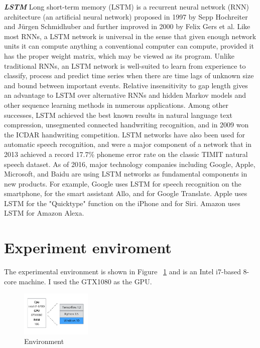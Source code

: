 \documentclass{kcc}
\begin{document}
\textbf{\textit{LSTM}}
Long short-term memory (LSTM) is a recurrent neural network (RNN) architecture (an artificial neural network) proposed in 1997 by Sepp Hochreiter and Jürgen Schmidhuber and further improved in 2000 by Felix Gers et al. Like most RNNs, a LSTM network is universal in the sense that given enough network units it can compute anything a conventional computer can compute, provided it has the proper weight matrix, which may be viewed as its program. Unlike traditional RNNs, an LSTM network is well-suited to learn from experience to classify, process and predict time series when there are time lags of unknown size and bound between important events. Relative insensitivity to gap length gives an advantage to LSTM over alternative RNNs and hidden Markov models and other sequence learning methods in numerous applications. Among other successes, LSTM achieved the best known results in natural language text compression, unsegmented connected handwriting recognition, and in 2009 won the ICDAR handwriting competition. LSTM networks have also been used for automatic speech recognition, and were a major component of a network that in 2013 achieved a record 17.7\% phoneme error rate on the classic TIMIT natural speech dataset. As of 2016, major technology companies including Google, Apple, Microsoft, and Baidu are using LSTM networks as fundamental components in new products. For example, Google uses LSTM for speech recognition on the smartphone, for the smart assistant Allo, and for Google Translate. Apple uses LSTM for the "Quicktype" function on the iPhone and for Siri. Amazon uses LSTM for Amazon Alexa.

\section{Experiment enviroment}

The experimental environment is shown in Figure ~\ref{fig:xeon} and is an Intel i7-based 8-core machine. I used the GTX1080 as the GPU.
\begin{figure}[h]
  \begin{center}
     \includegraphics[width=0.3\textwidth]{fig/env.png}
  \end{center}
  \caption{Environment}
  \label{fig:xeon}
\end{figure}
\end{document}
